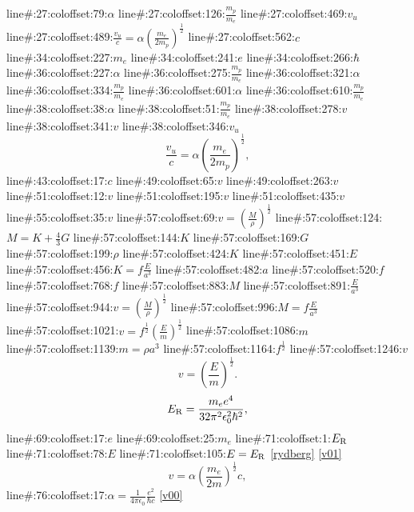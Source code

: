 line#:27:coloffset:79:$\alpha$
line#:27:coloffset:126:$\frac{m_p}{m_e}$
line#:27:coloffset:469:$v_u$
line#:27:coloffset:489:$\frac{v_u}{c}=\alpha\left(\frac{m_e}{2m_p}\right)^{\frac{1}{2}}$
line#:27:coloffset:562:$c$
line#:34:coloffset:227:$m_e$
line#:34:coloffset:241:$e$
line#:34:coloffset:266:$\hbar$
line#:36:coloffset:227:$\alpha$
line#:36:coloffset:275:$\frac{m_p}{m_e}$
line#:36:coloffset:321:$\alpha$
line#:36:coloffset:334:$\frac{m_p}{m_e}$
line#:36:coloffset:601:$\alpha$
line#:36:coloffset:610:$\frac{m_p}{m_e}$
line#:38:coloffset:38:$\alpha$
line#:38:coloffset:51:$\frac{m_p}{m_e}$
line#:38:coloffset:278:$v$
line#:38:coloffset:341:$v$
line#:38:coloffset:346:$v_u$
\begin{equation}
\frac{v_u}{c}=\alpha\left(\frac{m_e}{2m_p}\right)^{\frac{1}{2}},
\label{v0}
\end{equation}
line#:43:coloffset:17:$c$
line#:49:coloffset:65:$v$
line#:49:coloffset:263:$v$
line#:51:coloffset:12:$v$
line#:51:coloffset:195:$v$
line#:51:coloffset:435:$v$
line#:55:coloffset:35:$v$
line#:57:coloffset:69:$v=\left({\frac{M}{\rho}}\right)^{\frac{1}{2}}$
line#:57:coloffset:124:$M=K+\frac{4}{3}G$
line#:57:coloffset:144:$K$
line#:57:coloffset:169:$G$
line#:57:coloffset:199:$\rho$
line#:57:coloffset:424:$K$
line#:57:coloffset:451:$E$
line#:57:coloffset:456:$K=f\frac{E}{a^3}$
line#:57:coloffset:482:$a$
line#:57:coloffset:520:$f$
line#:57:coloffset:768:$f$
line#:57:coloffset:883:$M$
line#:57:coloffset:891:$\frac{E}{a^3}$
line#:57:coloffset:944:$v=\left({\frac{M}{\rho}}\right)^{\frac{1}{2}}$
line#:57:coloffset:996:$M=f\frac{E}{a^3}$
line#:57:coloffset:1021:$v=f^{\frac{1}{2}}\left(\frac{E}{m}\right)^{\frac{1}{2}}$
line#:57:coloffset:1086:$m$
line#:57:coloffset:1139:$m=\rho a^3$
line#:57:coloffset:1164:$f^{\frac{1}{2}}$
line#:57:coloffset:1246:$v$
\begin{equation}
v=\left(\frac{E}{m}\right)^{\frac{1}{2}}.
\label{v01}
\end{equation}
\begin{equation}
E_{\rm R}=\frac{m_ee^4}{32\pi^2\epsilon_0^2\hbar^2},
\label{rydberg}
\end{equation}
line#:69:coloffset:17:$e$
line#:69:coloffset:25:$m_e$
line#:71:coloffset:1:$E_{\rm R}$
line#:71:coloffset:78:$E$
line#:71:coloffset:105:$E=E_{\rm R}$
\ref{rydberg}
\ref{v01}
\begin{equation}
v=\alpha\left(\frac{m_e}{2m}\right)^{\frac{1}{2}}c,
\label{v00}
\end{equation}
line#:76:coloffset:17:$\alpha=\frac{1}{4\pi\epsilon_0}\frac{e^2}{\hbar c}$
\ref{v00}

